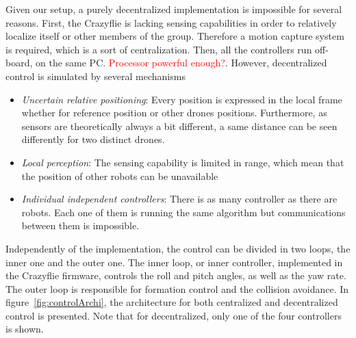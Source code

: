 \documentclass[a4paper, 12pt]{report}
\begin{document}
Given our setup, a purely decentralized implementation is impossible for several reasons. First, the Crazyflie is lacking sensing capabilities in order to relatively localize itself or other members of the group. Therefore a motion capture system is required, which is a sort of centralization. Then, all the controllers run off-board, on the same PC. \textcolor{red}{Processor powerful enough?}. 
However, decentralized control is simulated by several mechanisms
\begin{itemize}
\item \emph{Uncertain relative positioning}: Every position is expressed in the local frame whether for reference position or other drones positions. Furthermore, as sensors are theoretically always a bit different, a same distance can be seen differently for two distinct drones.
\item \emph{Local perception}: The sensing capability is limited in range, which mean that the position of other robots can be unavailable
\item \emph{Individual independent controllers}: There is as many controller as there are robots. Each one of them is running the same algorithm but communications between them is impossible.
\end{itemize}

Independently of the implementation, the control can be divided in two loops, the inner one and the outer one. The inner loop, or inner controller, implemented in the Crazyflie firmware, controls the roll and pitch angles, as well as the yaw rate. The outer loop is responsible for formation control and the collision avoidance. In figure~\ref{fig:controlArchi}, the architecture for both centralized and decentralized control is presented. Note that for decentralized, only one of the four controllers is shown.
\end{document}
